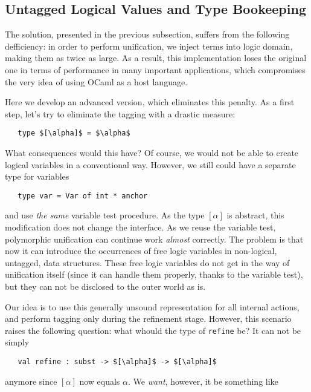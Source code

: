 \subsection{Untagged Logical Values and Type Bookeeping}

The solution, presented in the previous subsection, suffers from the following defficiency: in order to perform unification,
we inject terms into logic domain, making them as twice as large. As a result, this implementation loses the original one in 
terms of performance in many important applications, which compromises the very idea of using OCaml as a host language.

Here we develop an advanced version, which eliminates this penalty. As a first step, let's try to eliminate the tagging with
a drastic measure:

\begin{lstlisting}
   type $[\alpha]$ = $\alpha$
\end{lstlisting}

What consequences would this have? Of course, we would not be able to create logical variables in a conventional way. However, 
we still could have a separate type for variables

\begin{lstlisting}
   type var = Var of int * anchor
\end{lstlisting}

and use \emph{the same} variable test procedure. As the type $[\alpha]$ is abstract, this modification does not change the interface. 
As we reuse the variable test, polymorphic unification can continue work \emph{almost} correctly. The problem is that
now it can introduce the occurrences of free logic variables in non-logical, untagged, data structures. These free logic variables 
do not get in the way of unification itself (since it can handle them properly, thanks to the variable test), but they can not
be disclosed to the outer world as is.

Our idea is to use this generally unsound representation for all internal actions, and perform tagging only during the refinement
stage. However, this scenario raises the following question: what whould the type of \lstinline{refine} be? It can not be simply

\begin{lstlisting}
   val refine : subst -> $[\alpha]$ -> $[\alpha]$
\end{lstlisting}

anymore since $[\alpha]$ now equals $\alpha$. We \emph{want}, however, it be something like

